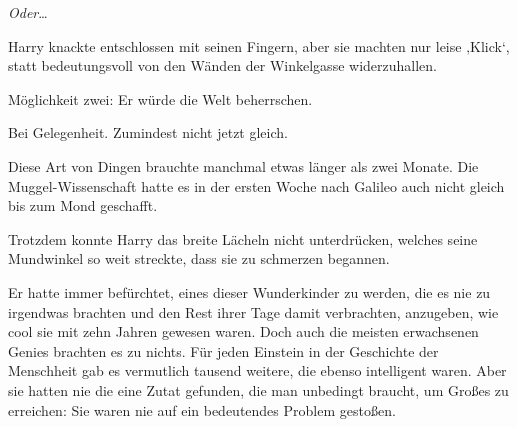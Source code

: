 \emph{Oder}…

Harry knackte entschlossen mit seinen Fingern, aber sie machten nur leise ‚Klick‘, statt bedeutungsvoll von den Wänden der Winkelgasse widerzuhallen.

Möglichkeit zwei: Er würde die Welt beherrschen.

Bei Gelegenheit. Zumindest nicht jetzt gleich.

Diese Art von Dingen brauchte manchmal etwas länger als zwei Monate. Die Muggel-Wissenschaft hatte es in der ersten Woche nach Galileo auch nicht gleich bis zum Mond geschafft.

Trotzdem konnte Harry das breite Lächeln nicht unterdrücken, welches seine Mundwinkel so weit streckte, dass sie zu schmerzen begannen.

Er hatte immer befürchtet, eines dieser Wunderkinder zu werden, die es nie zu irgendwas brachten und den Rest ihrer Tage damit verbrachten, anzugeben, wie cool sie mit zehn Jahren gewesen waren. Doch auch die meisten erwachsenen Genies brachten es zu nichts. Für jeden Einstein in der Geschichte der Menschheit gab es vermutlich tausend weitere, die ebenso intelligent waren. Aber sie hatten nie die eine Zutat gefunden, die man unbedingt braucht, um Großes zu erreichen: Sie waren nie auf ein bedeutendes Problem gestoßen.

